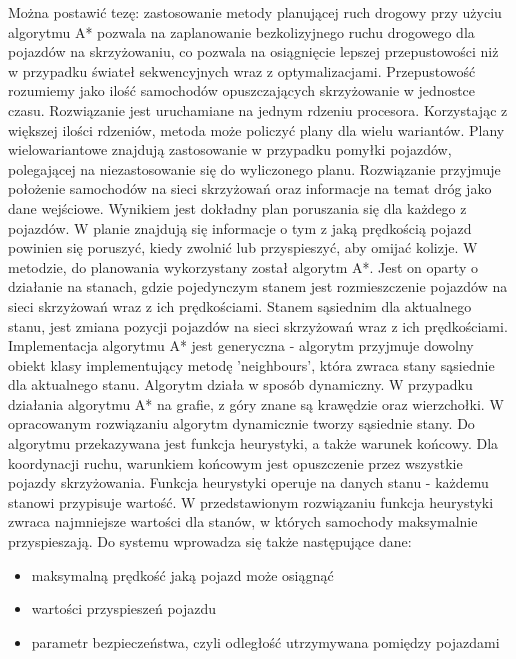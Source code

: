 Można postawić tezę: zastosowanie metody planującej ruch drogowy przy użyciu algorytmu A* pozwala na zaplanowanie bezkolizyjnego ruchu drogowego dla pojazdów na skrzyżowaniu, co pozwala na osiągnięcie lepszej przepustowości niż w przypadku świateł sekwencyjnych wraz z optymalizacjami. Przepustowość rozumiemy jako ilość samochodów opuszczających skrzyżowanie w jednostce czasu. Rozwiązanie jest uruchamiane na jednym rdzeniu procesora. Korzystając z większej ilości rdzeniów, metoda może policzyć plany dla wielu wariantów. Plany wielowariantowe znajdują zastosowanie w przypadku pomyłki pojazdów, polegającej na niezastosowanie się do wyliczonego planu.
\newline
\indent
Rozwiązanie przyjmuje położenie samochodów na sieci skrzyżowań oraz informacje na temat dróg jako dane wejściowe. Wynikiem jest dokładny plan poruszania się dla każdego z pojazdów. W planie znajdują się informacje o tym z jaką prędkością pojazd powinien się poruszyć, kiedy zwolnić lub przyspieszyć, aby omijać kolizje.
\newline
\indent
W metodzie, do planowania wykorzystany został algorytm A*. Jest on oparty o działanie na stanach, gdzie pojedynczym stanem jest rozmieszczenie pojazdów na sieci skrzyżowań wraz z ich prędkościami. Stanem sąsiednim dla aktualnego stanu, jest zmiana pozycji pojazdów na sieci skrzyżowań wraz z ich prędkościami. Implementacja algorytmu A* jest generyczna - algorytm przyjmuje dowolny obiekt klasy implementujący metodę 'neighbours', która zwraca stany sąsiednie dla aktualnego stanu. Algorytm działa w sposób dynamiczny. W przypadku działania algorytmu A* na grafie, z góry znane są krawędzie oraz wierzchołki. W opracowanym rozwiązaniu algorytm dynamicznie tworzy sąsiednie stany.
\newline
\indent
Do algorytmu przekazywana jest funkcja heurystyki, a także warunek końcowy. Dla koordynacji ruchu, warunkiem końcowym jest opuszczenie przez wszystkie pojazdy skrzyżowania. Funkcja heurystyki operuje na danych stanu - każdemu stanowi przypisuje wartość. W przedstawionym rozwiązaniu funkcja heurystyki zwraca najmniejsze wartości dla stanów, w których samochody maksymalnie przyspieszają.
\newline
\newline
\indent
Do systemu wprowadza się także następujące dane:
\begin{itemize}
\item maksymalną prędkość jaką pojazd może osiągnąć
\item wartości przyspieszeń pojazdu
\item parametr bezpieczeństwa, czyli odległość utrzymywana pomiędzy pojazdami
\end{itemize}
